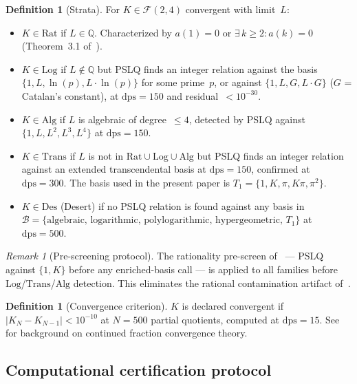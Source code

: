 \documentclass[12pt, reqno]{amsart}
\theoremstyle{definition}
\newtheorem{definition}[theorem]{Definition}
\theoremstyle{remark}
\newtheorem{remark}[theorem]{Remark}
\newcommand{\Rat}{\mathrm{Rat}}
\newcommand{\Log}{\mathrm{Log}}
\newcommand{\Alg}{\mathrm{Alg}}
\newcommand{\Trans}{\mathrm{Trans}}
\newcommand{\Des}{\mathrm{Des}}
\begin{document}
\begin{definition}[Strata]\label{def:strata}
For $K \in \mathcal{F}(2,4)$ convergent with limit~$L$:
\begin{itemize}
\item $K \in \Rat$ if $L \in \mathbb{Q}$. Characterized by $a(1)=0$ or $\exists\, k\ge 2\colon a(k)=0$ (Theorem~3.1 of~\cite{contamination}).
\item $K \in \Log$ if $L \notin \mathbb{Q}$ but PSLQ finds an integer relation against the basis
  $\{1, L, \ln(p), L \cdot \ln(p)\}$ for some prime~$p$, or against $\{1, L, G, L \cdot G\}$
  ($G$ = Catalan's constant), at $\mathrm{dps}=150$ and residual~$< 10^{-30}$.
\item $K \in \Alg$ if $L$ is algebraic of degree~$\le 4$, detected by PSLQ against
  $\{1, L, L^2, L^3, L^4\}$ at $\mathrm{dps}=150$.
\item $K \in \Trans$ if $L$ is not in $\Rat \cup \Log \cup \Alg$ but PSLQ finds an integer relation
  against an extended transcendental basis at $\mathrm{dps}=150$, confirmed at $\mathrm{dps}=300$.
  The basis used in the present paper is $T_1 = \{1, K, \pi, K\pi, \pi^2\}$.
\item $K \in \Des$ (Desert) if no PSLQ relation is found against any basis in
  $\mathcal{B} = \{\text{algebraic, logarithmic, polylogarithmic, hypergeometric, } T_1\}$ at $\mathrm{dps}=500$.
\end{itemize}
\end{definition}

\begin{remark}[Pre-screening protocol]\label{rem:prescreen}
The rationality pre-screen of~\cite{contamination}
--- PSLQ against $\{1, K\}$ before any enriched-basis call --- is applied to all
families before $\Log$/$\Trans$/$\Alg$ detection. This eliminates the rational
contamination artifact of~\cite[Remark~3.2]{contamination}.
\end{remark}

\begin{definition}[Convergence criterion]\label{def:conv}
$K$ is declared convergent if
$|K_N - K_{N-1}| < 10^{-10}$ at $N=500$ partial quotients, computed at $\mathrm{dps}=15$.
See~\cite{lorentzen} for background on continued fraction convergence theory.
\end{definition}

\subsection{Computational certification protocol}\label{ssec:certification}
\end{document}
